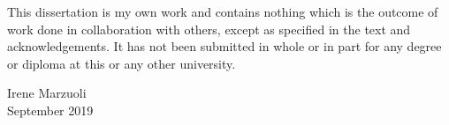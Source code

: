 
\vspace{.2cm}

\noindent This dissertation is my own work and contains nothing which is the outcome of work done in collaboration with others, except as specified in the text and acknowledgements.
%
It has not been submitted in whole or in part for any degree or diploma at this or any other university.

\vspace{1.5cm}

\begin{raggedleft}
Irene Marzuoli \\
September 2019

\end{raggedleft}


%
%

\thispagestyle{empty}

